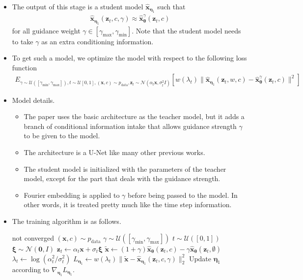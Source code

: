 \documentclass[10pt]{article}
\newcommand{\ve}[1]{\mathbf{#1}}
\newcommand{\ves}[1]{\boldsymbol{#1}}
\newcommand{\mcal}[1]{\mathcal{#1}}
\newcommand{\data}{\mathrm{data}}
\begin{document}
\begin{itemize}
  \item The output of this stage is a student model $\hat{\ve{x}}_{\ves{\eta}_1}$ such that
  \begin{align*}
    \hat{\ve{x}}_{\ves{\eta}_1}(\ve{z}_t, c, \gamma) \approx \hat{\ve{x}}_{\ves{\theta}}^\gamma(\ve{z}_t, c)
  \end{align*}
  for all guidance weight $\gamma \in [\gamma_{\max}, \gamma_{\min}]$. Note that the student model needs to take $\gamma$ as an extra conditioning information.

  \item To get such a model, we optimize the model with respect to the following loss function
  \begin{align*}
    E_{\gamma \sim \mcal{U}([\gamma_{\min},\gamma_{\max}]), t \sim \mcal{U}[0,1], (\ve{x},c) \sim p_{\data}, \ve{z}_t \sim \mcal{N}(\alpha_t\ve{x}, \sigma_t^2 I) }
    [ w(\lambda_t) \| \hat{\ve{x}}_{\ves{\eta}_1}(\ve{z}_t, w, c) - \hat{\ve{x}}^\gamma_{\ves{\theta}}(\ve{z}_t, c)  \|^2 ]
  \end{align*}

  \item Model details.
  \begin{itemize}
    \item The paper uses the basic architecture as the teacher model, but it adds a branch of conditional information intake that allows guidance strength $\gamma$ to be given to the model.
    
    \item The architecture is a U-Net like many other previous works.
    
    \item The student model is initialized with the parameters of the teacher model, except for the part that deals with the guidance strength.
    
    \item Fourier embedding \cite{Tancik:2020} is applied to $\gamma$ before being passed to the model. In other words, it is treated pretty much like the time step information.    
  \end{itemize}

  \item The training algorithm is as follows.
  \begin{codebox}
    \li \While not converged
    \li \Do
          $(\ve{x},c) \sim p_{\data}$
    \li   $\gamma \sim \mcal{U}([\gamma_{\min}, \gamma_{\max}])$
    \li   $t \sim \mcal{U}([0,1])$    
    \li   $\ves{\xi} \sim \mcal{N}(\ve{0}, I)$
    \li   $\ve{z}_t \leftarrow \alpha_t \ve{x} + \sigma_t \ves{\xi}$
    \li   $\tilde{\ve{x}} \leftarrow (1+\gamma)\hat{\ve{x}}_{\ves{\theta}}(\ve{z}_t, c) - \gamma\hat{\ve{x}}_{\ves{\theta}}(\ve{z}_t, \emptyset)$
    \li   $\lambda_t \leftarrow \log (\alpha_t^2 / \sigma_t^2)$
    \li   $L_{\ves{\eta}_1} \leftarrow w(\lambda_t) \| \tilde{\ve{x}} - \hat{\ve{x}}_{\ves{\eta}_1}(\ve{z}_t, c, \gamma) \|_2^2 $
    \li   Update $\ves{\eta}_1$ according to $\nabla_{\ves{\eta}_1} L_{\ves{\eta}_1}$.
        \End
  \end{codebox}
\end{itemize}
\end{document}

